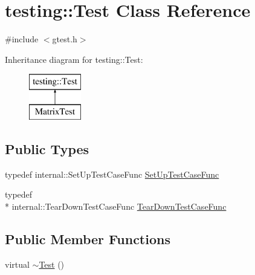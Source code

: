 \hypertarget{classtesting_1_1_test}{\section{testing\+:\+:Test Class Reference}
\label{classtesting_1_1_test}
}


{\ttfamily \#include $<$gtest.\+h$>$}

Inheritance diagram for testing\+:\+:Test\+:\begin{figure}[H]
\begin{center}
\leavevmode
\includegraphics[height=2.000000cm]{classtesting_1_1_test}
\end{center}
\end{figure}
\subsection*{Public Types}
\begin{DoxyCompactItemize}
\item 
typedef internal\+::\+Set\+Up\+Test\+Case\+Func \hyperlink{classtesting_1_1_test_a5f2a051d1d99c9b784c666c586186cf9}{Set\+Up\+Test\+Case\+Func}
\item 
typedef \\*
internal\+::\+Tear\+Down\+Test\+Case\+Func \hyperlink{classtesting_1_1_test_aa0f532e93b9f3500144c53f31466976c}{Tear\+Down\+Test\+Case\+Func}
\end{DoxyCompactItemize}
\subsection*{Public Member Functions}
\begin{DoxyCompactItemize}
\item 
virtual \hyperlink{classtesting_1_1_test_ad99dc9b12208fd4bffc367f0a1e3df1b}{$\sim$\+Test} ()
\end{DoxyCompactItemize}
